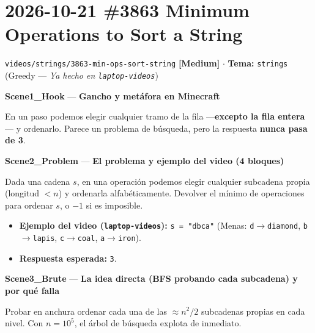 \documentclass[letterpaper,10pt]{article}
\newcommand{\scene}[2]{\noindent\textbf{\textcolor{mcaqua}{#1}} --- \textbf{#2}\par\vspace{1pt}}
\newcommand{\folder}[1]{\texttt{\textcolor{mcgreen}{#1}}}
\newcommand{\badge}[2]{\textbf{\textcolor{#1}{[#2]}}}
\begin{document}
\newpage

\section{2026-10-21 \textbar{} \#3863 Minimum Operations to Sort a String}
\folder{videos/strings/3863-min-ops-sort-string} \hfill \badge{mcgold}{Medium} $\cdot$ \textbf{Tema:} \texttt{strings} (Greedy --- \textit{Ya hecho en \texttt{laptop-videos}})

\begin{shaded}
\scene{Scene1\_Hook}{Gancho y met\'afora en Minecraft}
En un paso podemos elegir cualquier tramo de la fila ---\textbf{excepto la fila entera}--- y ordenarlo. Parece un problema de b\'usqueda, pero la respuesta \textbf{nunca pasa de 3}.

\scene{Scene2\_Problem}{El problema y ejemplo del video (4 bloques)}
Dada una cadena $s$, en una operaci\'on podemos elegir cualquier subcadena propia (longitud $< n$) y ordenarla alfab\'eticamente. Devolver el m\'inimo de operaciones para ordenar $s$, o $-1$ si es imposible.
\begin{itemize}\setlength{\itemsep}{1pt}
  \item \textbf{Ejemplo del video (\texttt{laptop-videos}):} \texttt{s = "dbca"} (Menas: \texttt{d}$\to$\texttt{diamond}, \texttt{b}$\to$\texttt{lapis}, \texttt{c}$\to$\texttt{coal}, \texttt{a}$\to$\texttt{iron}).
  \item \textbf{Respuesta esperada:} \texttt{3}.
\end{itemize}

\scene{Scene3\_Brute}{La idea directa (BFS probando cada subcadena) y por qu\'e falla}
Probar en anchura ordenar cada una de las $\approx n^2/2$ subcadenas propias en cada nivel. Con $n = 10^5$, el \'arbol de b\'usqueda explota de inmediato.


\end{shaded}
\end{document}
